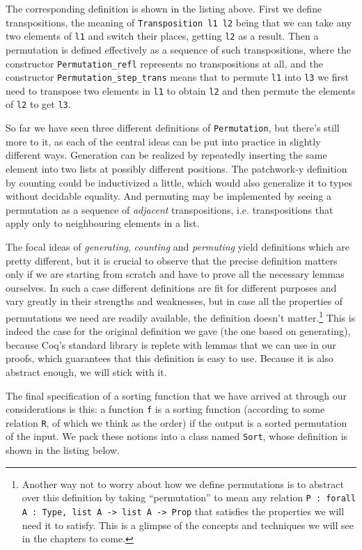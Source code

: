 \documentclass[declaration,mgr,english,shortabstract]{iithesis}
\newcommand{\m}[1]{\texttt{#1}}
\begin{document}
The corresponding definition is shown in the listing above. First we define transpositions, the meaning of \m{Transposition l1 l2} being that we can take any two elements of \m{l1} and switch their places, getting \m{l2} as a result. Then a permutation is defined effectively as a sequence of such transpositions, where the constructor \m{Permutation\_refl} represents no transpositions at all, and the constructor \m{Permutation\_step\_trans} means that to permute \m{l1} into \m{l3} we first need to transpose two elements in \m{l1} to obtain \m{l2} and then permute the elements of \m{l2} to get \m{l3}.

So far we have seen three different definitions of \m{Permutation}, but there's still more to it, as each of the central ideas can be put into practice in slightly different ways. Generation can be realized by repeatedly inserting the same element into two lists at possibly different positions. The patchwork-y definition by counting could be inductivized a little, which would also generalize it to types without decidable equality. And permuting may be implemented by seeing a permutation as a sequence of \textit{adjacent} transpositions, i.e. transpositions that apply only to neighbouring elements in a list.

The focal ideas of \textit{generating}, \textit{counting} and \textit{permuting} yield definitions which are pretty different, but it is crucial to observe that the precise definition matters only if we are starting from scratch and have to prove all the necessary lemmas ourselves. In such a case different definitions are fit for different purposes and vary greatly in their strengths and weaknesses, but in case all the properties of permutations we need are readily available, the definition doesn't matter.\footnote{Another way not to worry about how we define permutations is to abstract over this definition by taking ``permutation'' to mean any relation \m{P : forall A : Type, list A -> list A -> Prop} that satisfies the properties we will need it to satisfy. This is a glimpse of the concepts and techniques we will see in the chapters to come.} This is indeed the case for the original definition we gave (the one based on generating), because Coq's standard library is replete with lemmas that we can use in our proofs, which guarantees that this definition is easy to use. Because it is also abstract enough, we will stick with it.

The final specification of a sorting function that we have arrived at through our considerations is this: a function \m{f} is a sorting function (according to some relation \m{R}, of which we think as the order) if the output is a sorted permutation of the input. We pack these notions into a class named \m{Sort}, whose definition is shown in the listing below.
\end{document}
